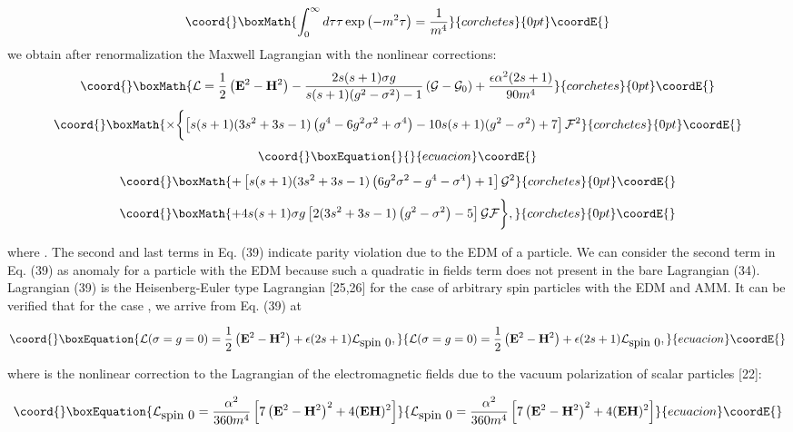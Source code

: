 \documentclass[a4paper,12pt]{article}
\begin{document}
\[\coord{}\boxMath{
\int_0^\infty d\tau \tau \exp \left( -m^2\tau \right) =\frac 1{m^4}
}{corchetes}{0pt}\coordE{}\]
we obtain after renormalization the Maxwell Lagrangian with the nonlinear
corrections:
\[\coord{}\boxMath{
\mathcal{L}=\frac 12\left( \mathbf{E}^2-\mathbf{H}^2\right) -\frac{
2s(s+1)\sigma g}{s(s+1)(g^2-\sigma ^2)-1}\left( \mathcal{G}-\mathcal{G}
_0\right) +\frac{\epsilon \alpha ^2(2s+1)}{90m^4}
}{corchetes}{0pt}\coordE{}\]
\[\coord{}\boxMath{
\times \biggl \{
\left[ s(s+1)(3s^2+3s-1)\left( g^4-6g^2\sigma ^2+\sigma ^4\right)
-10s(s+1)(g^2-\sigma ^2)+7\right] \mathcal{F}^2
}{corchetes}{0pt}\coordE{}\]
\vspace{-8mm}
\begin{equation}\coord{}\boxEquation{  \label{39}
}{  }{ecuacion}\coordE{}\end{equation}
\vspace{-8mm}
\[\coord{}\boxMath{
+\left[ s(s+1)(3s^2+3s-1)\left( 6g^2\sigma ^2-g^4-\sigma ^4\right) +1\right]
\mathcal{G}^2
}{corchetes}{0pt}\coordE{}\]
\[\coord{}\boxMath{
+4s(s+1)\sigma g\left[ 2(3s^2+3s-1)\left( g^2-\sigma ^2\right) -5\right]
\mathcal{GF}\biggr \},
}{corchetes}{0pt}\coordE{}\]

where \coordHE{}. The second and last terms in Eq. (39) indicate
parity violation due to the EDM of a particle. We can consider the second
term in Eq. (39) as anomaly for a particle with the EDM because such a
quadratic in fields term does not present in the bare Lagrangian (34).
Lagrangian (39) is the Heisenberg-Euler type Lagrangian [25,26] for the case
of arbitrary spin particles with the EDM and AMM. It can be verified that
for the case \coordHE{}, we arrive from Eq. (39) at

\begin{equation}\coord{}\boxEquation{
\mathcal{L}(\sigma =g=0)=\frac 12\left(
\mathbf{E}^2-\mathbf{H}^2\right) +\epsilon
(2s+1)\mathcal{L}_{\mbox{spin 0}},  \label{40}
}{
\mathcal{L}(\sigma =g=0)=\frac 12\left(
\mathbf{E}^2-\mathbf{H}^2\right) +\epsilon
(2s+1)\mathcal{L}_{\mbox{spin 0}},  }{ecuacion}\coordE{}\end{equation}

where \coordHE{} is the nonlinear correction to
the Lagrangian of the electromagnetic fields due to the vacuum
polarization of scalar particles [22]:

\begin{equation}\coord{}\boxEquation{
\mathcal{L}_{\mbox{spin 0}}=\frac{\alpha ^2}{360m^4}\left[ 7\left(
\mathbf{E} ^2-\mathbf{H}^2\right) ^2+4(\mathbf{EH})^2\right]
\label{41}
}{
\mathcal{L}_{\mbox{spin 0}}=\frac{\alpha ^2}{360m^4}\left[ 7\left(
\mathbf{E} ^2-\mathbf{H}^2\right) ^2+4(\mathbf{EH})^2\right]
}{ecuacion}\coordE{}\end{equation}
\end{document}
